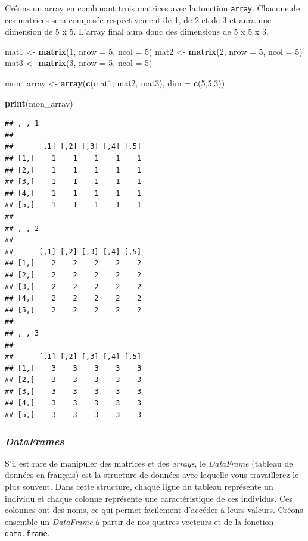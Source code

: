 \documentclass[
  11pt,
  french,
]{book}
\makeatletter
\newenvironment{Shaded}{\begin{snugshade}}{\end{snugshade}}
\newcommand{\DataTypeTok}[1]{\textcolor[rgb]{0.13,0.29,0.53}{#1}}
\newcommand{\DecValTok}[1]{\textcolor[rgb]{0.00,0.00,0.81}{#1}}
\newcommand{\KeywordTok}[1]{\textcolor[rgb]{0.13,0.29,0.53}{\textbf{#1}}}
\newcommand{\NormalTok}[1]{#1}
\newcommand{\StringTok}[1]{\textcolor[rgb]{0.31,0.60,0.02}{#1}}
\newenvironment{kframe}{%
\medskip{}
\setlength{\fboxsep}{.8em}
 \def\at@end@of@kframe{}%
 \ifinner\ifhmode%
  \def\at@end@of@kframe{\end{minipage}}%
  \begin{minipage}{\columnwidth}%
 \fi\fi%
 \def\FrameCommand##1{\hskip\@totalleftmargin \hskip-\fboxsep
 \colorbox{shadecolor}{##1}\hskip-\fboxsep
     \hskip-\linewidth \hskip-\@totalleftmargin \hskip\columnwidth}%
 \MakeFramed {\advance\hsize-\width
   \@totalleftmargin\z@ \linewidth\hsize
   \@setminipage}}%
 {\par\unskip\endMakeFramed%
 \at@end@of@kframe}
\renewenvironment{Shaded}{\begin{kframe}}{\end{kframe}}
\makeatother
\begin{document}
Créons un array en combinant trois matrices avec la fonction \texttt{array}. Chacune de ces matrices sera composée respectivement de 1, de 2 et de 3 et aura une dimension de 5 x 5. L'array final aura donc des dimensions de 5 x 5 x 3.

\begin{Shaded}
\begin{Highlighting}[]
\NormalTok{mat1 <-}\StringTok{ }\KeywordTok{matrix}\NormalTok{(}\DecValTok{1}\NormalTok{, }\DataTypeTok{nrow =} \DecValTok{5}\NormalTok{, }\DataTypeTok{ncol =} \DecValTok{5}\NormalTok{)}
\NormalTok{mat2 <-}\StringTok{ }\KeywordTok{matrix}\NormalTok{(}\DecValTok{2}\NormalTok{, }\DataTypeTok{nrow =} \DecValTok{5}\NormalTok{, }\DataTypeTok{ncol =} \DecValTok{5}\NormalTok{)}
\NormalTok{mat3 <-}\StringTok{ }\KeywordTok{matrix}\NormalTok{(}\DecValTok{3}\NormalTok{, }\DataTypeTok{nrow =} \DecValTok{5}\NormalTok{, }\DataTypeTok{ncol =} \DecValTok{5}\NormalTok{)}

\NormalTok{mon_array <-}\StringTok{ }\KeywordTok{array}\NormalTok{(}\KeywordTok{c}\NormalTok{(mat1, mat2, mat3), }\DataTypeTok{dim =} \KeywordTok{c}\NormalTok{(}\DecValTok{5}\NormalTok{,}\DecValTok{5}\NormalTok{,}\DecValTok{3}\NormalTok{))}

\KeywordTok{print}\NormalTok{(mon_array)}
\end{Highlighting}
\end{Shaded}

\begin{verbatim}
## , , 1
## 
##      [,1] [,2] [,3] [,4] [,5]
## [1,]    1    1    1    1    1
## [2,]    1    1    1    1    1
## [3,]    1    1    1    1    1
## [4,]    1    1    1    1    1
## [5,]    1    1    1    1    1
## 
## , , 2
## 
##      [,1] [,2] [,3] [,4] [,5]
## [1,]    2    2    2    2    2
## [2,]    2    2    2    2    2
## [3,]    2    2    2    2    2
## [4,]    2    2    2    2    2
## [5,]    2    2    2    2    2
## 
## , , 3
## 
##      [,1] [,2] [,3] [,4] [,5]
## [1,]    3    3    3    3    3
## [2,]    3    3    3    3    3
## [3,]    3    3    3    3    3
## [4,]    3    3    3    3    3
## [5,]    3    3    3    3    3
\end{verbatim}

\hypertarget{sect01364}{%
\subsubsection{\texorpdfstring{\emph{DataFrames}}{DataFrames}}\label{sect01364}}

S'il est rare de manipuler des matrices et des \emph{arrays}, le \emph{DataFrame} (tableau de données en français) est la structure de données avec laquelle vous travaillerez le plus souvent.
Dans cette structure, chaque ligne du tableau représente un individu et chaque colonne représente une caractéristique de ces individus. Ces colonnes ont des noms, ce qui permet facilement d'accéder à leurs valeurs. Créons ensemble un \emph{DataFrame} à partir de nos quatres vecteurs et de la fonction \texttt{data.frame}.
\end{document}
